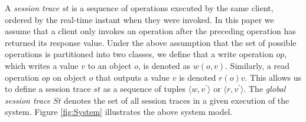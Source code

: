 \documentclass{sig-alternate-05-2015}
\begin{document}
  A \emph{session trace} $\mathit{st}$ is a sequence of operations executed by the same client, ordered by the real-time instant when they were invoked. In this paper we assume that a client only invokes an operation after the preceding operation has returned its response value.
Under the above assumption that the set of possible operations is partitioned into two classes, we define that a write operation $\mathit{op}$, which writes a value $v$ to an object $o$, is denoted as $w(o,v)$. Similarly, a read operation $\mathit{op}$ on object $o$ that outputs a value $v$ is denoted $r(o){v}$. %
 \def\tuple#1{\langle #1\rangle}
This allows us to define a session trace $\mathit{st}$ as a sequence of tuples  $\tuple{w, {v}^{'}}$ or
 $\tuple{r, {v}^{'}}$. %
The \emph{global session trace} $\mathit{St}$ denotes the set of all
   session traces in a given execution of the system.
    Figure \ref{fig:System} illustrates the above system model.
\end{document}
